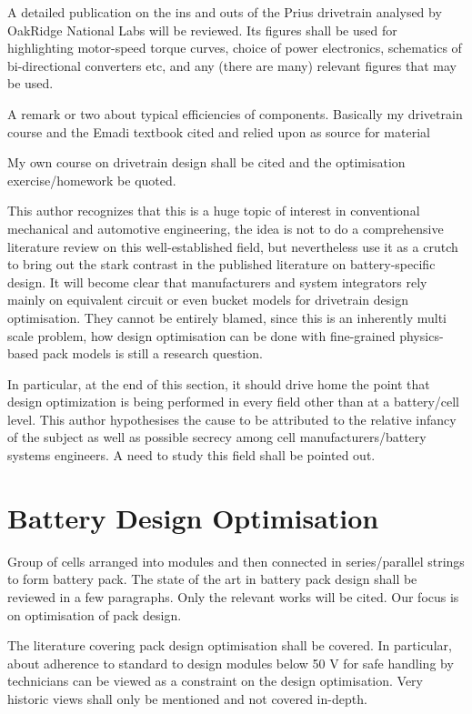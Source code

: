 A detailed publication on  the ins and outs of the  Prius drivetrain analysed by
OakRidge  National  Labs  will  be  reviewed. Its  figures  shall  be  used  for
highlighting motor-speed torque curves,  choice of power electronics, schematics
of bi-directional converters etc, and any (there are many) relevant figures that
may be used.

A  remark  or  two  about  typical  efficiencies  of  components.  Basically  my
drivetrain course  and the Emadi  textbook cited and  relied upon as  source for
material

My  own  course  on  drivetrain  design shall  be  cited  and  the  optimisation
exercise/homework be quoted.

This author  recognizes that this  is a huge  topic of interest  in conventional
mechanical and  automotive engineering, the  idea is  not to do  a comprehensive
literature review on  this well-established field, but nevertheless use  it as a
crutch  to  bring  out  the  stark  contrast  in  the  published  literature  on
battery-specific  design. It  will become  clear that  manufacturers and  system
integrators  rely  mainly  on  equivalent  circuit or  even  bucket  models  for
drivetrain design optimisation. They cannot be entirely blamed, since this is an
inherently  multi  scale problem,  how  design  optimisation  can be  done  with
fine-grained physics-based pack models is still a research question.

In particular, at the  end of this section, it should drive  home the point that
design  optimization  is  being  performed  in  every  field  other  than  at  a
battery/cell level. This  author hypothesises the cause to be  attributed to the
relative  infancy  of  the  subject  as well  as  possible  secrecy  among  cell
manufacturers/battery systems  engineers. A  need to study  this field  shall be
pointed out.

\section{Battery Design Optimisation}

Group  of cells  arranged into  modules  and then  connected in  series/parallel
strings to form battery pack. The state  of the art in battery pack design shall
be reviewed  in a  few paragraphs. Only  the relevant works  will be  cited. Our
focus is on optimisation of pack design.

The  literature  covering   pack  design  optimisation  shall   be  covered.  In
particular,  about adherence  to  standard  to design  modules  below  50 V  for
safe  handling by  technicians  can be  viewed  as a  constraint  on the  design
optimisation.  Very historic  views  shall  only be  mentioned  and not  covered
in-depth.

